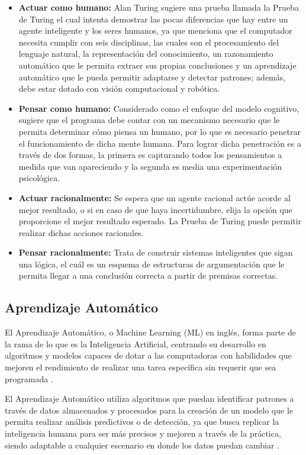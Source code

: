 \begin{itemize}
	\item \textbf{Actuar como humano:} Alan Turing sugiere una prueba llamada la Prueba de Turing el cual intenta demostrar las pocas diferencias que hay entre un agente inteligente y los seres humanos, ya que menciona que el computador necesita cumplir con seis disciplinas, las cuales son el procesamiento del lenguaje natural, la representación del conocimiento, un razonamiento automático que le permita extraer sus propias conclusiones y un aprendizaje automático que le pueda permitir adaptarse y detectar patrones; además, debe estar dotado con visión computacional y robótica.
	\item \textbf{Pensar como humano:} Considerado como el enfoque del modelo cognitivo, sugiere que el programa debe contar con un mecanismo necesario que le permita determinar cómo piensa un humano, por lo que es necesario penetrar el funcionamiento de dicha mente humana. Para lograr dicha penetración es a través de dos formas, la primera es capturando todos los pensamientos a medida que van apareciendo y la segunda es media una experimentación psicológica.
	\item \textbf{Actuar racionalmente:} Se espera que un agente racional actúe acorde al mejor resultado, o si en caso de que haya incertidumbre, elija la opción que proporcione el mejor resultado esperado. La Prueba de Turing puede permitir realizar dichas acciones racionales.
	\item \textbf{Pensar racionalmente:} Trata de construir sistemas inteligentes que sigan una lógica, el cuál es un esquema de estructuras de argumentación que le permita llegar a una conclusión correcta a partir de premisas correctas.
\end{itemize}
 
\subsection{Aprendizaje Automático}
El Aprendizaje Automático, o Machine Learning (ML) en inglés, forma parte de la rama de lo que es la Inteligencia Artificial, centrando su desarrollo en algoritmos y modelos capaces de  dotar a las computadoras con habilidades que mejoren el rendimiento de realizar una tarea específica sin requerir que sea programada \parencite{pr_diaz}. 

El Aprendizaje Automático utiliza algoritmos que puedan identificar patrones a través de datos almacenados y procesados para la creación de un modelo que le permita realizar análisis predictivos o de detección, ya que busca replicar la inteligencia humana para ser más precisos y mejoren a través de la práctica, siendo adaptable a cualquier escenario en donde los datos puedan cambiar \parencite{gl_azure}.

